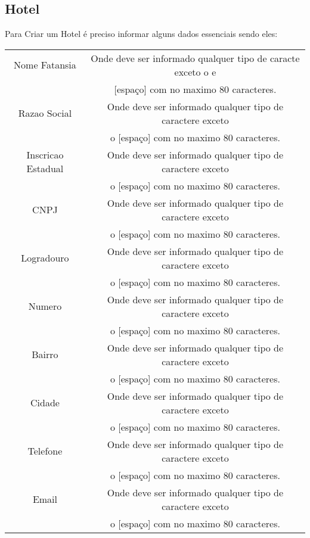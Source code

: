 \documentclass[titlepage]{article}
\begin{document}
				\subsection{Hotel}
				Para Criar um Hotel é preciso informar alguns dados essenciais sendo eles:\\
				\begin{table}[h]%
					\begin{tabular}{|c|c|}
						\hline
						Nome Fatansia & Onde deve ser informado qualquer tipo de caracte exceto o e \\ & [espaço] com no maximo 80 caracteres.\\
						\hline
						Razao Social & Onde deve ser informado qualquer tipo de caractere exceto \\ & o [espaço] com no maximo 80 caracteres.\\
						\hline
						Inscricao Estadual & Onde deve ser informado qualquer tipo de caractere exceto \\ & o [espaço] com no maximo 80 caracteres.\\
						\hline
						CNPJ & Onde deve ser informado qualquer tipo de caractere exceto \\ & o [espaço] com no maximo 80 caracteres.\\
						\hline
						Logradouro & Onde deve ser informado qualquer tipo de caractere exceto \\ & o [espaço] com no maximo 80 caracteres.\\
						\hline
						Numero & Onde deve ser informado qualquer tipo de caractere exceto \\ & o [espaço] com no maximo 80 caracteres.\\
						\hline
						Bairro & Onde deve ser informado qualquer tipo de caractere exceto \\ & o [espaço] com no maximo 80 caracteres.\\
						\hline
						Cidade & Onde deve ser informado qualquer tipo de caractere exceto \\ & o [espaço] com no maximo 80 caracteres.\\
						\hline
						Telefone & Onde deve ser informado qualquer tipo de caractere exceto \\ & o [espaço] com no maximo 80 caracteres.\\
						\hline
						Email & Onde deve ser informado qualquer tipo de caractere exceto \\ & o [espaço] com no maximo 80 caracteres.\\
						\hline

\end{tabular}
\end{table}
\end{document}

